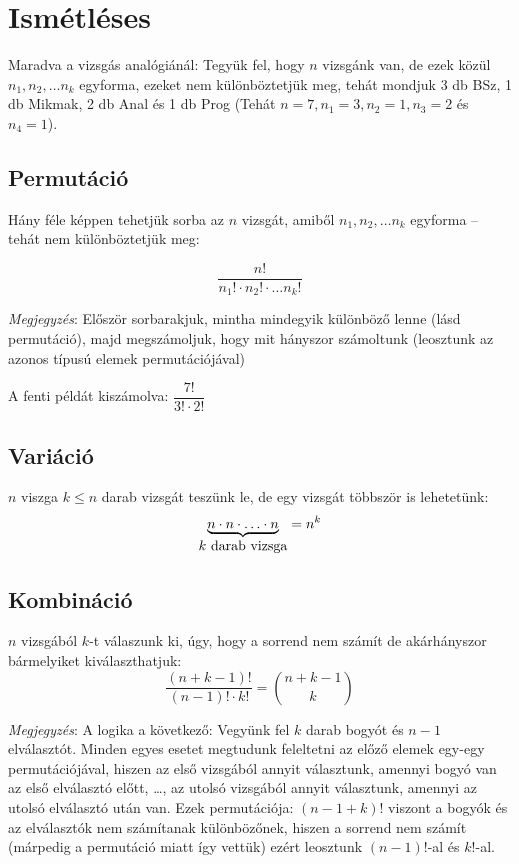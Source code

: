 \documentclass[a4paper,12pt,twoside]{book}
\theoremstyle{break}
\begin{document}
\section{Ismétléses}

Maradva a vizsgás analógiánál: Tegyük fel, hogy $n$ vizsgánk van, de ezek közül $n_1, n_2, \ldots n_k$ egyforma, ezeket nem különböztetjük meg, tehát mondjuk 3 db BSz, 1 db Mikmak, 2 db Anal és 1 db Prog (Tehát $n=7, n_1 = 3, n_2 = 1, n_3 = 2$ és $n_4=1$).

\subsection{Permutáció}

Hány féle képpen tehetjük sorba az $n$ vizsgát, amiből $n_1, n_2, \ldots n_k$ egyforma -- tehát nem különböztetjük meg:

\[\boxed{\frac{n!}{n_1!\cdot n_2! \cdot \ldots n_k!}}\]

\emph{Megjegyzés}: Először sorbarakjuk, mintha mindegyik különböző lenne (lásd permutáció), majd megszámoljuk, hogy mit hányszor számoltunk (leosztunk az azonos típusú elemek permutációjá\-val)

A fenti példát kiszámolva: $\dfrac{7!}{3!\cdot 2!}$

\subsection{Variáció}

$n$ viszga $k\leqslant n$ darab vizsgát teszünk le, de egy vizsgát többször is lehetetünk:
\[\underbrace{n\cdot n\cdot \ldots \cdot n}_{\hbox{$k$ darab vizsga}} = n^k\]

\subsection{Kombináció}

$n$ vizsgából $k$-t válaszunk ki, úgy, hogy a sorrend nem számít de akárhányszor bármelyiket kiválaszthatjuk:
\[\boxed{\frac{(n+k-1)!}{(n-1)!\cdot k!} = \binom{n+k-1}{k}}\]

\emph{Megjegyzés}: A logika a következő: Vegyünk fel $k$ darab bogyót és $n-1$ elválasztót. Minden egyes esetet megtudunk feleltetni az előző elemek egy-egy permutációjával, hiszen az első vizsgából annyit választunk, amennyi bogyó van az első elválasztó előtt, {\ldots},  az utolsó vizsgából annyit választunk, amennyi az utolsó elválasztó után van. Ezek permutációja: $(n-1+k)!$ viszont a bogyók és az elválasztók nem számítanak különbözőnek, hiszen a sorrend nem számít (márpedig a permutáció miatt így vettük) ezért leosztunk $(n-1)!$-al és $k!$-al.
\end{document}
